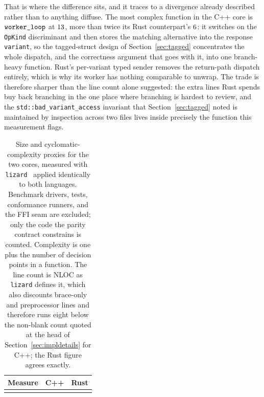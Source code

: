 \documentclass[english,twoside,openright,a4paper,censored,csm,software-track-2020]{HYthesisML}
\begin{document}
That is where the difference sits, and it traces to a divergence already described rather than
to anything diffuse. The most complex function in the C++ core is
$\texttt{worker\_loop}$ at $13$, more than twice its Rust counterpart's $6$: it
switches on the \texttt{OpKind} discriminant and then stores the matching alternative into the
response \texttt{variant}, so the tagged-struct design of Section~\ref{sec:tagged} concentrates
the whole dispatch, and the correctness argument that goes with it, into one branch-heavy
function. Rust's per-variant typed sender removes the return-path dispatch entirely, which is
why its worker has nothing comparable to unwrap. The trade is therefore sharper than the line
count alone suggested: the extra lines Rust spends buy back branching in the one place where
branching is hardest to review, and the \texttt{std::bad\_variant\_access} invariant that
Section~\ref{sec:tagged} noted is maintained by inspection across two files lives inside
precisely the function this measurement flags.

\begin{table}
\centering
\small
\caption[Size and cyclomatic-complexity proxies for the two cores]{Size and cyclomatic-complexity proxies for the two cores, measured with
\texttt{lizard}~\cite{lizard} applied identically to both languages. Benchmark drivers, tests,
conformance runners, and the FFI seam are excluded; only the code the parity contract
constrains is counted. Complexity is one plus the number of decision points in a function.
The line count is NLOC as \texttt{lizard} defines it, which also discounts brace-only and
preprocessor lines and therefore runs eight below the non-blank count quoted at the head of
Section~\ref{sec:impldetails} for C++; the Rust figure agrees
exactly.\label{tab:complexity}}
\begin{tabular}{@{}l r r@{}}
\hline\hline
Measure & C++ & Rust \\
\hline
\\
\hline
\end{tabular}
\end{table}
\end{document}
